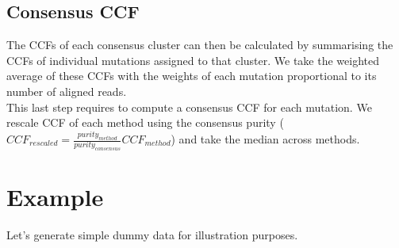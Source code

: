 \documentclass{article}\usepackage[]{graphicx}\usepackage[]{color}
\begin{document}
\subsection*{Consensus CCF}
The CCFs of each consensus cluster can then be calculated by
summarising the CCFs of individual mutations assigned to that
cluster. We take the weighted average of these CCFs with the weights
of each mutation proportional to its number of aligned reads.\\
This last step requires to compute a consensus CCF for each
mutation. We rescale CCF of each method using the consensus purity
(\(CCF_{rescaled}=\frac{purity_{method}}{purity_{consensus}}CCF_{method}\)) and
  take the median across methods. \\


\newpage
\section*{Example}

Let's generate simple dummy data for illustration purposes.
\end{document}
